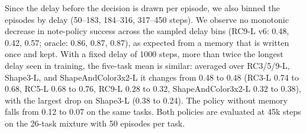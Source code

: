 \documentclass{IJCAS}
\begin{document}
Since the delay before the decision is drawn per episode, we also binned the episodes by delay (50--183, 184--316, 317--450 steps). We observe no monotonic decrease in note-policy success across the sampled delay bins (RC9-L v6: 0.48, 0.42, 0.57; oracle: 0.86, 0.87, 0.87), as expected from a memory that is written once and kept. With a fixed delay of 1000 steps, more than twice the longest delay seen in training, the five-task mean is similar: averaged over RC3/5/9-L, Shape3-L, and ShapeAndColor3x2-L it changes from 0.48 to 0.48 (RC3-L 0.74 to 0.68, RC5-L 0.68 to 0.76, RC9-L 0.28 to 0.32, ShapeAndColor3x2-L 0.32 to 0.38), with the largest drop on Shape3-L (0.38 to 0.24). The policy without memory falls from 0.12 to 0.07 on the same tasks. Both policies are evaluated at 45k steps on the 26-task mixture with 50 episodes per task.
\end{document}
